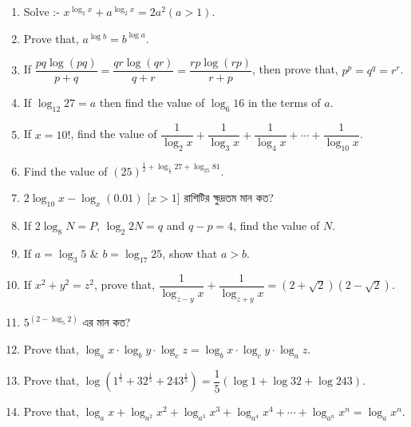 \documentclass[11pt, a4paper]{article}
\begin{document}
\begin{enumerate}
     	\item Solve :- $ x^{\log_2 x} + a^{\log_2 x} = 2a^2(a>1) $.
     	
     	\item Prove that, $ a^{\log b} = b^{\log a} $.
     	
     	\item If $ \dfrac{pq\log (pq)}{p+q} = \dfrac{qr\log (qr)}{q+r} = \dfrac{rp\log (rp)}{r+p} $, then prove that, $ p^p = q^q = r^r $.
     	
     	\item If $ \log_{12} 27 = a $ then find the value of $ \log_{6} 16 $ in the terms of $a$.
     	
     	\item If $ x = 10! $, find the value of $ \dfrac{1}{\log_2 x} + \dfrac{1}{\log_3 x} + \dfrac{1}{\log_4 x} + \cdots + \dfrac{1}{\log_{10} x} $.
     	
     	\item Find the value of $ (25)^{\frac{1}{2} + \log_{\frac{1}{5}} 27+ \log_{25} 81} $.
     	
     	\item $ 2\log_{10} x - \log_x (0.01) $ [$x>1$] \textbengali{রাশিটির ক্ষুদ্রতম মান কত}?
     	
     	\item If $ 2 \log_8 N = P $, $ \log_2 2N = q $ and $ q - p = 4 $, find the value of $ N $.
     	
     	\item If $ a = \log_3 5 $  \& $ b = \log_{17} 25 $, show that $ a>b $.
     	
     	\item If $ x^2 + y^2 = z^2 $, prove that, $ \dfrac{1}{\log_{z-y} x} + \dfrac{1}{\log_{z+y} x} = (2+\sqrt{2}) (2-\sqrt{2}) $.
     	
     	\item $ 5^{(2 - \log_5 2)} $ \textbengali{এর মান কত?}
     	
     	\item Prove that, $ \log_a x \cdot \log_b y \cdot \log_c z = \log_b x \cdot \log_c y \cdot \log_a z$.
     	
     	\item Prove that, $ \log (1^{\frac{1}{5}} + 32^{\frac{1}{5}} + 243^{\frac{1}{5}}) = \dfrac{1}{5} \left( \log 1 + \log 32 + \log 243\right) $.
     	
     	\item Prove that, $ \log_a x + \log_{a^2} x^2 + \log_{a^3} x^3 + \log_{a^4} x^4  + \cdots + \log_{a^n}x^n = \log_a x^n$.
     	

\end{enumerate}
\end{document}
